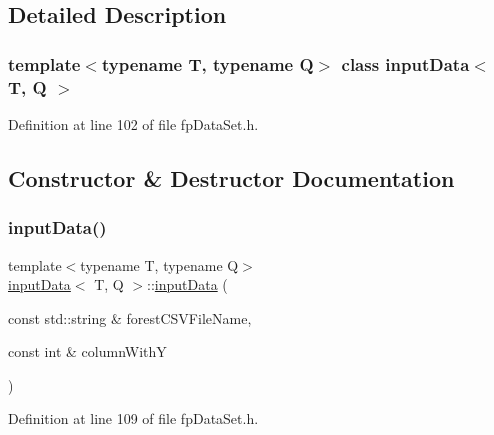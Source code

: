 \subsection{Detailed Description}
\subsubsection*{template$<$typename T, typename Q$>$\newline
class input\+Data$<$ T, Q $>$}



Definition at line 102 of file fp\+Data\+Set.\+h.



\subsection{Constructor \& Destructor Documentation}
\mbox{\label{classinputData_a5247a5643a16302f98d913a5d705d866}} 
\subsubsection{\texorpdfstring{input\+Data()}{inputData()}}
{\footnotesize\ttfamily template$<$typename T, typename Q$>$ \\
\hyperlink{classinputData}{input\+Data}$<$ T, Q $>$\+::\hyperlink{classinputData}{input\+Data} (\begin{DoxyParamCaption}\item[{const std\+::string \&}]{forest\+C\+S\+V\+File\+Name,  }\item[{const int \&}]{column\+WithY }\end{DoxyParamCaption})\hspace{0.3cm}{\ttfamily [inline]}}



Definition at line 109 of file fp\+Data\+Set.\+h.


